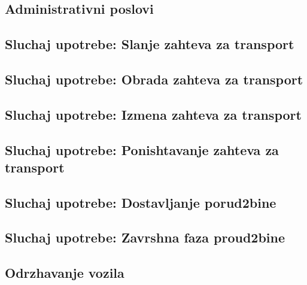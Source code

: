\documentclass{article}
\begin{document}
\subsection{Administrativni poslovi}



\subsection{Sluchaj upotrebe: Slanje zahteva za transport}


\subsection{Sluchaj upotrebe: Obrada zahteva za transport}


\subsection{Sluchaj upotrebe: Izmena zahteva za transport}


\subsection{Sluchaj upotrebe: Ponishtavanje zahteva za transport}


\subsection{Sluchaj upotrebe: Dostavljanje porud2bine}

\subsection{Sluchaj upotrebe: Zavrshna faza proud2bine}


\subsection{Odrzhavanje vozila}




\nocite{*}
\selectfont



\end{document}
